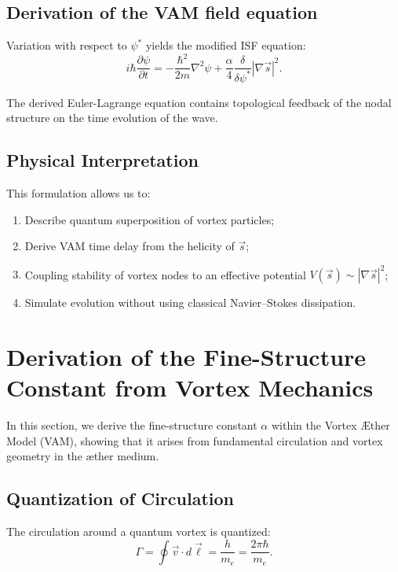 \documentclass[preprint]{revtex4-2}
\begin{document}
\subsection{Derivation of the VAM field equation}

Variation with respect to $\psi^*$ yields the modified ISF equation:
\[
    i\hbar \frac{\partial \psi}{\partial t} =
    - \frac{\hbar^2}{2m} \nabla^2 \psi
    + \frac{\alpha}{4} \frac{\delta}{\delta \psi^*} |\nabla \vec{s}|^2.
\]

The derived Euler-Lagrange equation contains topological feedback of the nodal structure on the time evolution of the wave.

\subsection{Physical Interpretation}

This formulation allows us to:
\begin{enumerate}
    \item Describe quantum superposition of vortex particles; \item Derive VAM time delay from the helicity of $\vec{s}$;
    \item Coupling stability of vortex nodes to an effective potential \( V(\vec{s}) \sim |\nabla \vec{s}|^2 \);
    \item Simulate evolution without using classical Navier–Stokes dissipation.
\end{enumerate}

\section{Derivation of the Fine-Structure Constant from Vortex Mechanics}
\label{sec:appendix-alpha}

In this section, we derive the fine-structure constant \( \alpha \) within the Vortex Æther Model (VAM), showing that it arises from fundamental circulation and vortex geometry in the æther medium.

\subsection{Quantization of Circulation}

The circulation around a quantum vortex is quantized:
\begin{equation}
    \Gamma = \oint \vec{v} \cdot d\vec{\ell} = \frac{h}{m_e} = \frac{2\pi \hbar}{m_e}.
\end{equation}
\end{document}
